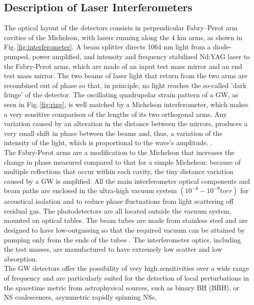 \documentclass[binding=0.6cm, LaM]{sapthesis}
\begin{document}
\subsection{Description of Laser Interferometers}

	The optical layout of the detectors consists in perpendicular 
	Fabry–Perot arm cavities of the Michelson, 
	with lasers running along the 4 km arms, as shown in Fig.\,\ref{fig:interferometer}. 
	A beam splitter directs 1064 nm light from a diode-pumped, power amplified, 
	and intensity and frequency stabilized Nd:YAG laser to the Fabry-Perot arms, 
	which are made of an input test mass mirror and an end test mass mirror. 
	The two beams of laser light that return from the two arms are recombined out of phase so that, 
	in principle, no light reaches the so-called 'dark fringe' of the detector. 
	The oscillating quadrupolar strain pattern of a GW, 
	as seen in Fig.\,\ref{fig:ring}, is well matched by a Michelson interferometer,
        which makes a very sensitive comparison of the lengths of its two orthogonal arms.
	Any variation caused by an alteration in the distance between the mirrors, 
	produces a very small shift in phase between the beams and, thus, 
	a variation of the intensity of the light, which is proportional to the wave's amplitude. \cite{10}. \\
	The Fabry-Perot arms are a modification to the Michelson 
	that increases the change in phase measured compared to that for a simple Michelson: 
	because of multiple reflections that occur within each cavity, 
	the tiny distance variation caused by a GW is amplified. 
	All the main interferometer optical components and beam paths are enclosed in the ultra-high vacuum system
        $(10^{−8} - 10^{−9} torr)$ for acoustical isolation and to reduce phase fluctuations from light scattering off residual gas.
        The photodetectors are all located outside the vacuum system, mounted on optical tables.
        The beam tubes are made from stainless steel and are designed to have low-outgassing
        so that the required vacuum can be attained by pumping only from the ends of the tubes \cite{11}. 
        The interferometer optics, including the test masses, are manufactured to have extremely low scatter and low absorption. \\
	The GW detectors offer the possibility of very high sensitivities over a wide range of frequency and
        are particularly suited for the detection of local perturbations in the spacetime metric from astrophysical sources,
        such as binary BH (BBH), or NS coalescences, asymmetric rapidly spinning NSs,
\end{document}

